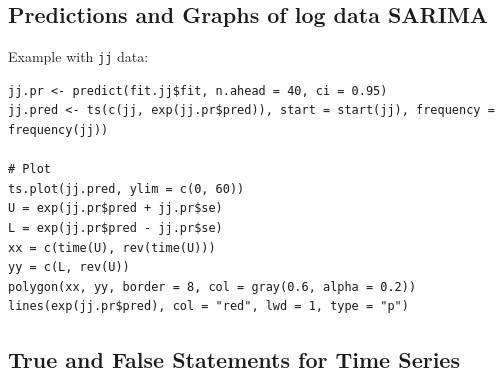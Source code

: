 \documentclass[11pt]{article}
\newcommand{\noi}{\noindent}
\begin{document}
\subsection{Predictions and Graphs of log data SARIMA}
\noi Example with \texttt{jj} data:
\begin{lstlisting}
jj.pr <- predict(fit.jj$fit, n.ahead = 40, ci = 0.95)
jj.pred <- ts(c(jj, exp(jj.pr$pred)), start = start(jj), frequency = frequency(jj))

# Plot
ts.plot(jj.pred, ylim = c(0, 60))
U = exp(jj.pr$pred + jj.pr$se)
L = exp(jj.pr$pred - jj.pr$se)
xx = c(time(U), rev(time(U)))
yy = c(L, rev(U))
polygon(xx, yy, border = 8, col = gray(0.6, alpha = 0.2))
lines(exp(jj.pr$pred), col = "red", lwd = 1, type = "p")
\end{lstlisting}

\subsection{True and False Statements for Time Series}
\end{document}
